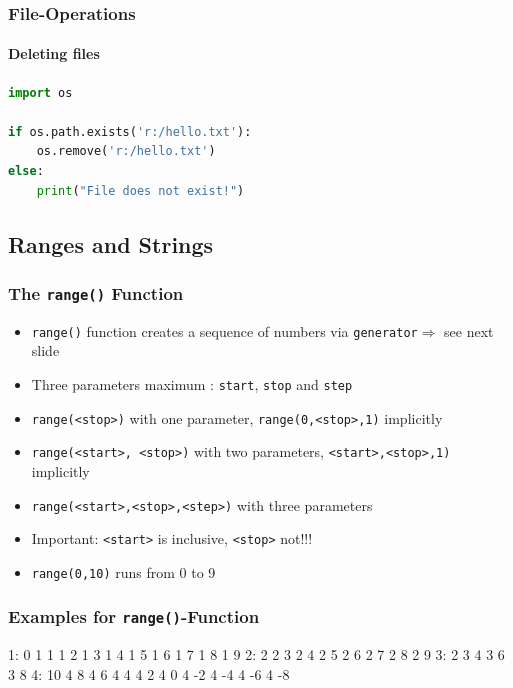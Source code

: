 \documentclass[english]{beamer}
\newcommand{\ta}[1]{\textattachfile[color=1 0 0]{#1}{Code}}
\begin{document}
\begin{frame}[containsverbatim]
\frametitle{File-Operations}
\framesubtitle{Deleting files}

\begin{lstlisting}[language=Python,caption={Deleting a file}]
import os

if os.path.exists('r:/hello.txt'):
    os.remove('r:/hello.txt')
else:
    print("File does not exist!")   
\end{lstlisting}

\end{frame}

\subsection{Ranges and Strings}



\begin{frame}[containsverbatim]
\frametitle{The \texttt{range()} Function}

\begin{itemize}
\item \texttt{range()} function creates a sequence of numbers via \texttt{generator}$\Rightarrow$ see next slide
\item Three parameters maximum : \texttt{start}, \texttt{stop} and \texttt{step}
\item \texttt{range(<stop>)} with one parameter,  \texttt{range(0,<stop>,1)} implicitly
\item \texttt{range(<start>, <stop>)} with two parameters, \texttt{<start>,<stop>,1)} implicitly 
\item \texttt{range(<start>,<stop>,<step>)} with three parameters
\item Important: \texttt{<start>} is inclusive, \texttt{<stop>} not!!!
\item \texttt{range(0,10)} runs from 0 to 9
\end{itemize}
\end{frame}

\begin{frame}[containsverbatim]
\frametitle{Examples for \texttt{range()}-Function}



\begin{ausgabe}
1: 0	1 1	1 2	1 3	1 4	1 5	1 6	1 7	1 8	1 9
2: 2	2 3	2 4	2 5	2 6	2 7	2 8	2 9		
3: 2	3 4	3 6	3 8						
4: 10	4 8	4 6	4 4	4 2	4 0	4 -2	4 -4	4 -6	4 -8
\end{ausgabe}

\end{frame}
\end{document}
